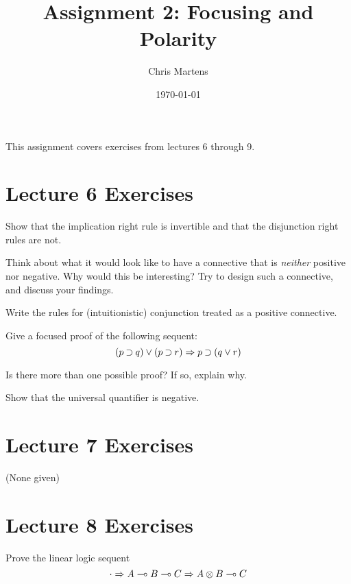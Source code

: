 \documentclass{article}
\title{Assignment 2: Focusing and Polarity}
\author{Chris Martens}
\date{\today}
\begin{document}
\maketitle

This assignment covers exercises from lectures 6 through 9.

\section{Lecture 6 Exercises}
\begin{exercise}
Show that the implication right rule is invertible and that the disjunction right rules are not.
\end{exercise}

\begin{exercise}
Think about what it would look like to have a connective that is \emph{neither} positive nor
negative. Why would this be interesting? Try to design such a connective, and discuss your findings.
\end{exercise}


\begin{exercise}
  Write the rules for (intuitionistic) conjunction treated as a positive connective.
\end{exercise}


\begin{exercise}
  Give a focused proof of the following sequent:
  \[ (p \mathbin{\supset} q) \vee (p \mathbin{\supset} r) \Rightarrow p \mathbin{\supset} (q \vee r) \]
  
  Is there more than one possible proof? If so, explain why.
\end{exercise}


\begin{exercise}
Show that the universal quantifier is negative.
\end{exercise}


\section{Lecture 7 Exercises}

(None given)


\section{Lecture 8 Exercises}


\begin{exercise}
  Prove the linear logic sequent 
  \[\cdot \Rightarrow A \multimap B \multimap C \Rightarrow A \otimes B \multimap C\]
\end{exercise}
\end{document}
